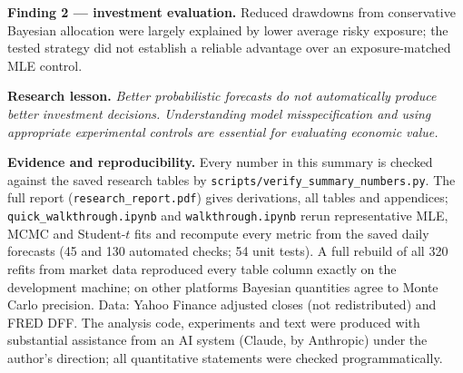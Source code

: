 \documentclass[11pt]{article}
\begin{document}
\textbf{Finding 2 --- investment evaluation.} Reduced drawdowns from conservative Bayesian allocation were largely
explained by lower average risky exposure; the tested strategy did not establish a reliable advantage over an
exposure-matched MLE control.

\textbf{Research lesson.} \emph{Better probabilistic forecasts do not automatically produce better investment
decisions. Understanding model misspecification and using appropriate experimental controls are essential for
evaluating economic value.}

\medskip
{\footnotesize\raggedright\color{muted}\textbf{Evidence and reproducibility.} Every number in this summary is checked against the
saved research tables by \texttt{scripts/verify\_summary\_numbers.py}. The full report (\texttt{research\_report.pdf}) gives derivations,
all tables and appendices; \texttt{quick\_walkthrough.ipynb} and \texttt{walkthrough.ipynb} rerun representative MLE,
MCMC and Student-$t$ fits and recompute every metric from the saved daily forecasts (45 and 130 automated checks; 54
unit tests). A full rebuild of all 320 refits from market data reproduced every table column exactly on the
development machine; on other platforms Bayesian quantities agree to Monte Carlo precision. Data: Yahoo Finance
adjusted closes (not redistributed) and FRED DFF.
The analysis code, experiments and text were produced with substantial assistance from an AI system (Claude, by
Anthropic) under the author's direction; all quantitative statements were checked programmatically.\par}
{\footnotesize\setlength{\bibsep}{1.5pt}

}
\end{document}
